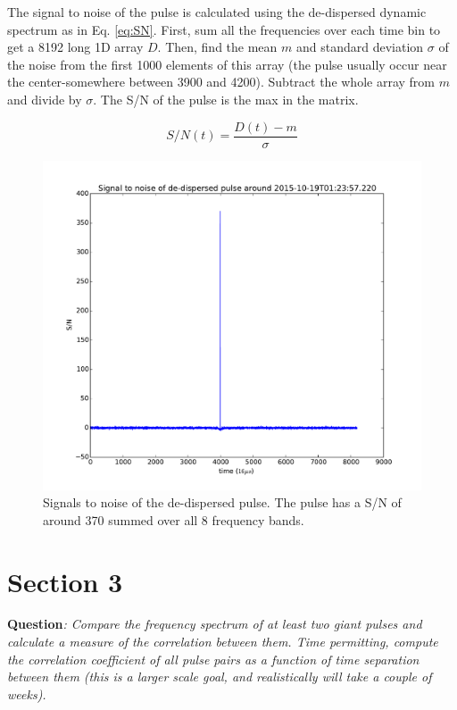 \documentclass[apj]{emulateapj}
\begin{document}
The signal to noise of the pulse is calculated using the de-dispersed dynamic spectrum as in Eq. \ref{eq:SN}. First, sum all the frequencies over each time bin to get a 8192 long 1D array $D$. Then, find the mean $m$ and standard deviation $\sigma$ of the noise from the first 1000 elements of this array (the pulse usually occur near the center-somewhere between 3900 and 4200). Subtract the whole array from $m$ and divide by $\sigma$. The S/N of the pulse is the max in the matrix.     

\begin{equation}\label{eq:SN}
    S/N(t) = \frac{D(t)-m}{\sigma}
\end{equation}


\begin{figure}[H]
\includegraphics[width=1.0\columnwidth]{S-N.pdf}
\caption{Signals to noise of the de-dispersed pulse. The pulse has a S/N of around 370 summed over all 8 frequency bands.}
\label{fig:SN}
\end{figure}


\section{Section 3}
\label{sec:3}
\textbf{Question}\textit{: Compare the frequency spectrum of at least two giant pulses and calculate a measure of the correlation between them. Time permitting, compute the correlation coefficient of all pulse pairs as a function of time separation between them (this is a larger scale goal, and realistically will take a couple of weeks).}
\end{document}
